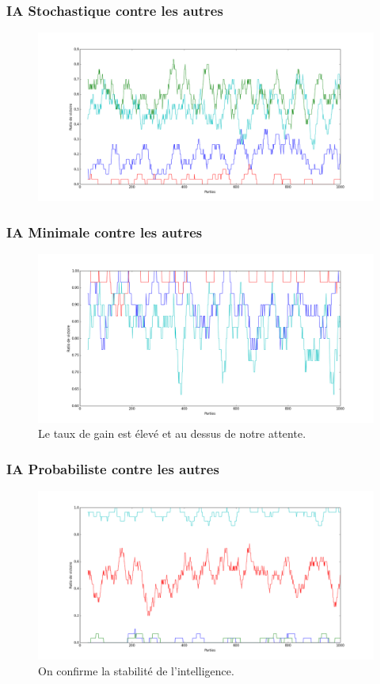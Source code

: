 \documentclass{beamer}
\begin{document}
\begin{frame}
  \frametitle{IA Stochastique contre les autres}
  \begin{figure}
    \includegraphics[scale=0.265]{plot/ivre}
  \end{figure}
\end{frame}

\begin{frame}
  \frametitle{IA Minimale contre les autres}
  \begin{figure}
    \includegraphics[scale=0.265]{plot/debile}
    \caption{
      \label{fig_debile} Le taux de gain est élevé et au dessus de notre attente.
    }
  \end{figure}
\end{frame}

\begin{frame}
  \frametitle{IA Probabiliste contre les autres}
  \begin{figure}
    \includegraphics[scale=0.265]{plot/stats}
    \caption{
      \label{fig_stats} On confirme la stabilité de l'intelligence.
    }
  \end{figure}
\end{frame}
\end{document}
